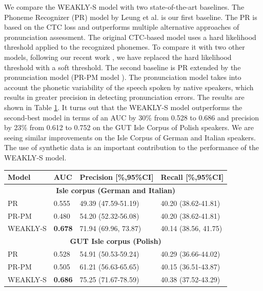 \documentclass[]{interact}
\theoremstyle{plain}%
\theoremstyle{definition}
\theoremstyle{remark}
\begin{document}
We compare the WEAKLY-S model with two state-of-the-art baselines. The Phoneme Recognizer (PR) model by Leung et al. \cite{leung2019cnn} is our first baseline. The PR is based on the CTC loss \cite{graves2012connectionist} and outperforms multiple alternative approaches of pronunciation assessment. The original CTC-based model uses a hard likelihood threshold applied to the recognized phonemes. To compare it with two other models, following our recent work \cite{korzekwa2021mispronunciation}, we have replaced the hard likelihood threshold with a soft threshold. The second baseline is  PR extended by the pronunciation model (PR-PM model \cite{korzekwa2021mispronunciation}). The pronunciation model takes into account the phonetic variability of the speech spoken by native speakers, which results in greater precision in detecting pronunciation errors. The results are shown in Table \ref{tab:weaklys_accuracy_metrics}. It turns out that the WEAKLY-S model outperforms the second-best model in terms of an AUC by 30\% from 0.528 to 0.686 and precision by 23\% from 0.612 to 0.752 on the GUT Isle Corpus of Polish speakers. We are seeing similar improvements on the Isle Corpus of German and Italian speakers. The use of synthetic data is an important contribution to the performance of the WEAKLY-S model.

\begin{table}
  {
  \centering
   \begin{tabular}{llll}
    \toprule
     Model & AUC & Precision [\%,95\%CI] & Recall [\%,95\%CI] \\
    \midrule
    \multicolumn{4}{c}{\textbf{Isle corpus (German and Italian)}} \\
    PR & 0.555 & 49.39 (47.59-51.19) & 40.20 (38.62-41.81)\\ 
    PR-PM & 0.480 & 54.20 (52.32-56.08) & 40.20 (38.62-41.81)\\  
    WEAKLY-S & \textbf{0.678} & 71.94 (69.96, 73.87) & 40.14 (38.56, 41.75) \\  
	
	 \multicolumn{4}{c}{\textbf{GUT Isle corpus (Polish)}} \\
     PR & 0.528 & 54.91 (50.53-59.24) & 40.29 (36.66-44.02)\\ 
     PR-PM & 0.505 & 61.21 (56.63-65.65) & 40.15 (36.51-43.87)\\  
     WEAKLY-S & \textbf{0.686} & 75.25 (71.67-78.59) & 40.38 (37.52-43.29)\\    
    \bottomrule
  \end{tabular}
  }
   \label{tab:weaklys_accuracy_metrics}
\end{table}
\end{document}
